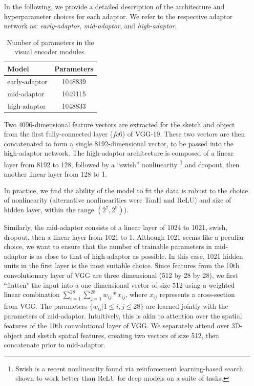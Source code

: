 \documentclass[9pt,twocolumn,twoside]{pnas-new}
\begin{document}
{In the following, we provide a detailed description of the architecture and hyperparameter choices for each adaptor. We refer to the respective adaptor network as: \textit{early-adaptor}, \textit{mid-adaptor}, and \textit{high-adaptor}.

\begin{table}
\centering
\begin{tabular}{| l | c |}
\hline
Model & Parameters \\
\hline
\hline
early-adaptor & 1048839 \\
\hline
mid-adaptor & 1049115 \\
\hline
high-adaptor & 1048833 \\
\hline
\end{tabular}
\caption{Number of parameters in the visual encoder modules.}
\label{table:parameters}
\end{table}

Two 4096-dimensional feature vectors are extracted for the sketch and object from the first fully-connected layer ($fc6$) of VGG-19. These two vectors are then concatenated to form a single 8192-dimensional vector, to be passed into the high-adaptor network. The high-adaptor architecture is composed of a linear layer from 8192 to 128, followed by a ``swish'' nonlinearity \footnote{Swish is a recent nonlinearity found via reinforcement learning-based search shown to work better than ReLU for deep models on a suite of tasks.} \cite[]{ramachandran2018searching} and dropout, then another linear layer from 128 to 1.

In practice, we find the ability of the model to fit the data is robust to the choice of nonlinearity (alternative nonlinearities were TanH and ReLU) and size of hidden layer, within the range $(2^{7},2^{9})$).

Similarly, the mid-adaptor consists of a linear layer of 1024 to 1021, swish, dropout, then a linear layer from 1021 to 1. Although 1021 seems like a peculiar choice, we want to ensure that the number of trainable parameters in mid-adaptor is as close to that of high-adaptor as possible. In this case, 1021 hidden units in the first layer is the most suitable choice. Since features from the 10th convolutionary layer of VGG are three dimensional (512 by 28 by 28), we first ``flatten" the input into a one dimensional vector of size 512 using a weighted linear combination $\sum_{i=1}^{28}\sum_{j=1}^{28} w_{ij} * x_{ij}$, where $x_{ij}$ represents a cross-section from VGG. The parameters  $\{w_{ij}|1\leq i,j \leq 28\}$ are learned jointly with the parameters of mid-adaptor. Intuitively, this is akin to attention over the spatial features of the 10th convolutional layer of VGG. We separately attend over 3D-object and sketch spatial features, creating two vectors of size 512, then concatenate prior to mid-adaptor.

}
\end{document}

